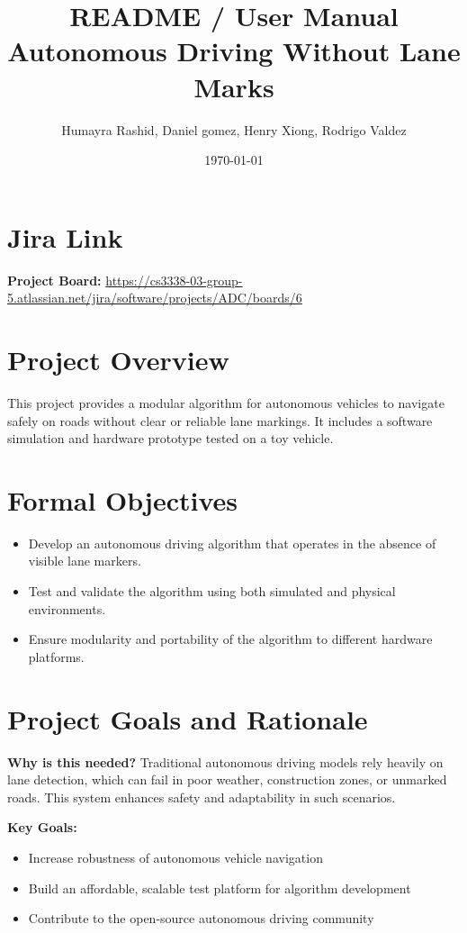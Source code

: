 \documentclass[12pt]{article}
\title{README / User Manual\\\large Autonomous Driving Without Lane Marks}
\author{Humayra Rashid, Daniel gomez, Henry Xiong, Rodrigo Valdez}
\date{\today}
\begin{document}
\maketitle


\section*{Jira Link}
\textbf{Project Board:} \url{https://cs3338-03-group-5.atlassian.net/jira/software/projects/ADC/boards/6}

\section{Project Overview}
This project provides a modular algorithm for autonomous vehicles to navigate safely on roads without clear or reliable lane markings. It includes a software simulation and hardware prototype tested on a toy vehicle.

\section{Formal Objectives}
\begin{itemize}
  \item Develop an autonomous driving algorithm that operates in the absence of visible lane markers.
  \item Test and validate the algorithm using both simulated and physical environments.
  \item Ensure modularity and portability of the algorithm to different hardware platforms.
\end{itemize}

\section{Project Goals and Rationale}
\textbf{Why is this needed?} Traditional autonomous driving models rely heavily on lane detection, which can fail in poor weather, construction zones, or unmarked roads. This system enhances safety and adaptability in such scenarios.

\textbf{Key Goals:}
\begin{itemize}
  \item Increase robustness of autonomous vehicle navigation
  \item Build an affordable, scalable test platform for algorithm development
  \item Contribute to the open-source autonomous driving community
\end{itemize}
\end{document}
